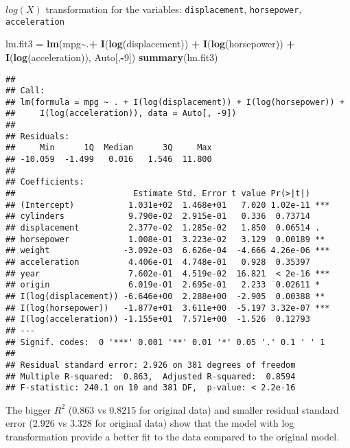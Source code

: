 \documentclass[
]{article}
\newenvironment{Shaded}{\begin{snugshade}}{\end{snugshade}}
\newcommand{\DecValTok}[1]{\textcolor[rgb]{0.00,0.00,0.81}{#1}}
\newcommand{\FunctionTok}[1]{\textcolor[rgb]{0.13,0.29,0.53}{\textbf{#1}}}
\newcommand{\NormalTok}[1]{#1}
\newcommand{\OtherTok}[1]{\textcolor[rgb]{0.56,0.35,0.01}{#1}}
\newcommand{\SpecialCharTok}[1]{\textcolor[rgb]{0.81,0.36,0.00}{\textbf{#1}}}
\begin{document}
\(log(X)\) transformation for the variables: \texttt{displacement},
\texttt{horsepower}, \texttt{acceleration}

\begin{Shaded}
\begin{Highlighting}[]
\NormalTok{lm.fit3 }\OtherTok{=} \FunctionTok{lm}\NormalTok{(mpg}\SpecialCharTok{\textasciitilde{}}\NormalTok{.}\SpecialCharTok{+} \FunctionTok{I}\NormalTok{(}\FunctionTok{log}\NormalTok{(displacement)) }\SpecialCharTok{+} \FunctionTok{I}\NormalTok{(}\FunctionTok{log}\NormalTok{(horsepower)) }\SpecialCharTok{+} \FunctionTok{I}\NormalTok{(}\FunctionTok{log}\NormalTok{(acceleration)), Auto[,}\SpecialCharTok{{-}}\DecValTok{9}\NormalTok{])}
\FunctionTok{summary}\NormalTok{(lm.fit3)}
\end{Highlighting}
\end{Shaded}

\begin{verbatim}
## 
## Call:
## lm(formula = mpg ~ . + I(log(displacement)) + I(log(horsepower)) + 
##     I(log(acceleration)), data = Auto[, -9])
## 
## Residuals:
##     Min      1Q  Median      3Q     Max 
## -10.059  -1.499   0.016   1.546  11.800 
## 
## Coefficients:
##                        Estimate Std. Error t value Pr(>|t|)    
## (Intercept)           1.031e+02  1.468e+01   7.020 1.02e-11 ***
## cylinders             9.790e-02  2.915e-01   0.336  0.73714    
## displacement          2.377e-02  1.285e-02   1.850  0.06514 .  
## horsepower            1.008e-01  3.223e-02   3.129  0.00189 ** 
## weight               -3.092e-03  6.626e-04  -4.666 4.26e-06 ***
## acceleration          4.406e-01  4.748e-01   0.928  0.35397    
## year                  7.602e-01  4.519e-02  16.821  < 2e-16 ***
## origin                6.019e-01  2.695e-01   2.233  0.02611 *  
## I(log(displacement)) -6.646e+00  2.288e+00  -2.905  0.00388 ** 
## I(log(horsepower))   -1.877e+01  3.611e+00  -5.197 3.32e-07 ***
## I(log(acceleration)) -1.155e+01  7.571e+00  -1.526  0.12793    
## ---
## Signif. codes:  0 '***' 0.001 '**' 0.01 '*' 0.05 '.' 0.1 ' ' 1
## 
## Residual standard error: 2.926 on 381 degrees of freedom
## Multiple R-squared:  0.863,  Adjusted R-squared:  0.8594 
## F-statistic: 240.1 on 10 and 381 DF,  p-value: < 2.2e-16
\end{verbatim}

The bigger \(R^2\) (0.863 vs 0.8215 for original data) and smaller
residual standard error (2.926 vs 3.328 for original data) show that the
model with log transformation provide a better fit to the data compared
to the original model.
\end{document}
